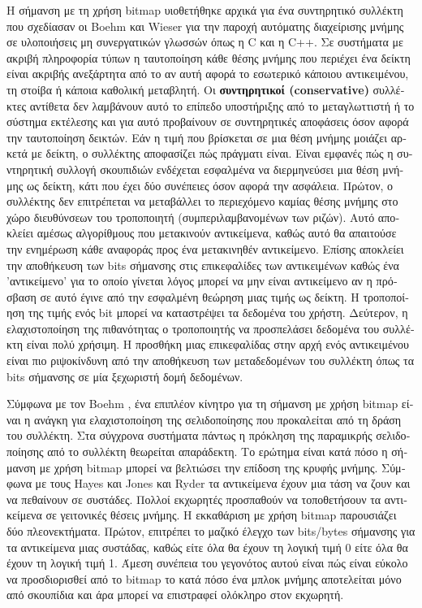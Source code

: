 \begin{greek}
Η σήμανση με τη χρήση bitmap υιοθετήθηκε αρχικά για ένα συντηρητικό
συλλέκτη που σχεδίασαν οι Boehm και Wieser \cite{DBLP:journals/spe/BoehmW88}
για την παροχή αυτόματης διαχείρισης μνήμης σε υλοποιήσεις μη 
συνεργατικών γλωσσών όπως η C και η C++. Σε συστήματα με ακριβή
πληροφορία τύπων η ταυτοποίηση κάθε θέσης μνήμης που περιέχει
ένα δείκτη είναι ακριβής ανεξάρτητα από το αν αυτή αφορά το 
εσωτερικό κάποιου αντικειμένου, τη στοίβα ή κάποια καθολική μεταβλητή.
Οι \textbf{συντηρητικοί (conservative)} συλλέκτες αντίθετα δεν
λαμβάνουν αυτό το επίπεδο υποστήριξης από το μεταγλωττιστή ή 
το σύστημα εκτέλεσης και για αυτό προβαίνουν σε συντηρητικές
αποφάσεις όσον αφορά την ταυτοποίηση δεικτών. Εάν η τιμή που
βρίσκεται σε μια θέση μνήμης μοιάζει αρκετά με δείκτη, ο συλλέκτης
αποφασίζει πώς πράγματι είναι. Είναι εμφανές πώς η συντηρητική
συλλογή σκουπιδιών ενδέχεται εσφαλμένα να διερμηνεύσει μια θέση
μνήμης ως δείκτη, κάτι που έχει δύο συνέπειες όσον αφορά την 
ασφάλεια. Πρώτον, ο συλλέκτης δεν επιτρέπεται να μεταβάλλει το
περιεχόμενο καμίας θέσης μνήμης στο χώρο διευθύνσεων του τροποποιητή
(συμπεριλαμβανομένων των ριζών). Αυτό αποκλείει αμέσως αλγορίθμους
που μετακινούν αντικείμενα, καθώς αυτό θα απαιτούσε την ενημέρωση
κάθε αναφοράς προς ένα μετακινηθέν αντικείμενο. Επίσης αποκλείει
την αποθήκευση των bits σήμανσης στις επικεφαλίδες των αντικειμένων
καθώς ένα 'αντικείμενο' για το οποίο γίνεται λόγος μπορεί να μην
είναι αντικείμενο αν η πρόσβαση σε αυτό έγινε από την εσφαλμένη
θεώρηση μιας τιμής ως δείκτη. Η τροποποίηση της τιμής ενός bit
μπορεί να καταστρέψει τα δεδομένα του χρήστη. Δεύτερον, η ελαχιστοποίηση
της πιθανότητας ο τροποποιητής να προσπελάσει δεδομένα του
συλλέκτη είναι πολύ χρήσιμη. Η προσθήκη μιας επικεφαλίδας στην
αρχή ενός αντικειμένου είναι πιο ριψοκίνδυνη από την αποθήκευση
των μεταδεδομένων του συλλέκτη όπως τα bits  σήμανσης σε μία
ξεχωριστή δομή δεδομένων.

Σύμφωνα με τον Boehm \cite{DBLP:conf/iwmm/Boehm00}, ένα επιπλέον
κίνητρο για τη σήμανση με χρήση bitmap είναι η ανάγκη για ελαχιστοποίηση 
της σελιδοποίησης που προκαλείται από τη δράση του συλλέκτη.
Στα σύγχρονα συστήματα πάντως η πρόκληση της παραμικρής σελιδοποίησης
από το συλλέκτη θεωρείται απαράδεκτη. Το ερώτημα είναι κατά πόσο
η σήμανση με χρήση bitmap μπορεί να βελτιώσει την επίδοση της
κρυφής μνήμης. Σύμφωνα με τους Hayes \cite{DBLP:conf/oopsla/Hayes91}
και Jones και Ryder \cite{DBLP:conf/iwmm/JonesR08} τα αντικείμενα
έχουν μια τάση να ζουν και να πεθαίνουν σε συστάδες. Πολλοί εκχωρητές 
προσπαθούν να τοποθετήσουν τα αντικείμενα σε γειτονικές θέσεις
μνήμης. Η εκκαθάριση με χρήση bitmap παρουσιάζει δύο πλεονεκτήματα.
Πρώτον, επιτρέπει το μαζικό έλεγχο των bits/bytes σήμανσης για 
τα αντικείμενα μιας συστάδας, καθώς είτε όλα θα έχουν τη λογική
τιμή 0 είτε όλα θα έχουν τη λογική τιμή 1. Άμεση συνέπεια του
γεγονότος αυτού είναι πώς είναι εύκολο να προσδιορισθεί από το
bitmap το κατά πόσο ένα μπλοκ μνήμης αποτελείται μόνο από
σκουπίδια και άρα μπορεί να επιστραφεί ολόκληρο στον εκχωρητή.


\end{greek}
